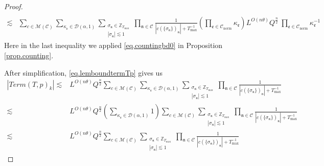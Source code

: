 \begin{proof}
\begin{equation}
\begin{split}
    \\
    \lesssim &\sum_{c\in \mathscr{M}(\mathcal{C}) }\sum_{\kappa_{\mathfrak{e}}\in \mathcal{D}(\alpha,1)}\sum_{\substack{\sigma_{\mathfrak{n}}\in \mathbb{Z}_{T_{\text{max}}}\\ |\sigma_{\mathfrak{n}}|\lesssim 1}}\prod_{\mathfrak{n}\in \mathcal{C}}\frac{1}{|c(\{\sigma_{\mathfrak{n}}\})_{\mathfrak{n}}|+T^{-1}_{\text{max}}} \left(\prod_{\mathfrak{e}\in \mathcal{C}_{\text{norm}}}\kappa_{\mathfrak{e}}\right)L^{O(n\theta)} Q^{\frac{n}{2}}\ \prod_{\mathfrak{e}\in \mathcal{C}_{\text{norm}}} \kappa^{-1}_{\mathfrak{e}}
\end{split}
\end{equation}
Here in the last inequality we applied \eqref{eq.countingbd0} in Proposition \ref{prop.counting}.

After simplification, \eqref{eq.lemboundtermTp} gives us 
\begin{equation}\label{eq.lemboundtermTpsimplify}
\begin{split}
    |Term(T, p)_k|\lesssim &L^{O(n\theta)} Q^{\frac{n}{2}}\sum_{c\in \mathscr{M}(\mathcal{C}) }\sum_{\kappa_{\mathfrak{e}}\in \mathcal{D}(\alpha,1)}\sum_{\substack{\sigma_{\mathfrak{n}}\in \mathbb{Z}_{T_{\text{max}}}\\ |\sigma_{\mathfrak{n}}|\lesssim 1}} \prod_{\mathfrak{n}\in \mathcal{C}}\frac{1}{|c(\{\sigma_{\mathfrak{n}}\})_{\mathfrak{n}}|+T^{-1}_{\text{max}}}
    \\
    \lesssim &L^{O(n\theta)} Q^{\frac{n}{2}} \left(\sum_{\kappa_{\mathfrak{e}}\in \mathcal{D}(\alpha,1)} 1\right) \sum_{c\in \mathscr{M}(\mathcal{C})}\sum_{\substack{\sigma_{\mathfrak{n}}\in \mathbb{Z}_{T_{\text{max}}}\\ |\sigma_{\mathfrak{n}}|\lesssim 1}} \prod_{\mathfrak{n}\in \mathcal{C}}\frac{1}{|c(\{\sigma_{\mathfrak{n}}\})_{\mathfrak{n}}|+T^{-1}_{\text{max}}}
    \\
    \lesssim & L^{O(n\theta)} Q^{\frac{n}{2}} \sum_{c\in \mathscr{M}(\mathcal{C})}\sum_{\substack{\sigma_{\mathfrak{n}}\in \mathbb{Z}_{T_{\text{max}}}\\ |\sigma_{\mathfrak{n}}|\lesssim 1}} \prod_{\mathfrak{n}\in \mathcal{C}}\frac{1}{|c(\{\sigma_{\mathfrak{n}}\})_{\mathfrak{n}}|+T^{-1}_{\text{max}}}
\end{split}
\end{equation}

\end{proof}
